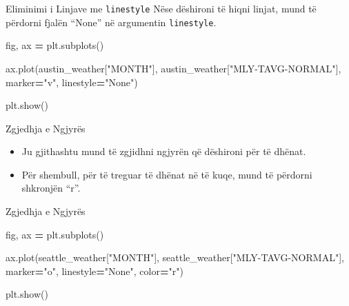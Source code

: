 \documentclass[
  ignorenonframetext,
]{beamer}
\newenvironment{Shaded}{\begin{snugshade}}{\end{snugshade}}
\newcommand{\NormalTok}[1]{#1}
\newcommand{\OperatorTok}[1]{\textcolor[rgb]{0.81,0.36,0.00}{\textbf{#1}}}
\newcommand{\StringTok}[1]{\textcolor[rgb]{0.31,0.60,0.02}{#1}}
\begin{document}
\begin{frame}[fragile]{Eliminimi i Linjave me \texttt{linestyle}}
\protect\hypertarget{eliminimi-i-linjave-me-linestyle}{}
Nëse dëshironi të hiqni linjat, mund të përdorni fjalën ``None'' në
argumentin \texttt{linestyle}.


\begin{Shaded}
\begin{Highlighting}[]
\NormalTok{fig, ax }\OperatorTok{=}\NormalTok{ plt.subplots()}

\NormalTok{ax.plot(austin\_weather[}\StringTok{"MONTH"}\NormalTok{], austin\_weather[}\StringTok{"MLY{-}TAVG{-}NORMAL"}\NormalTok{],}
\NormalTok{marker}\OperatorTok{=}\StringTok{"v"}\NormalTok{, linestyle}\OperatorTok{=}\StringTok{"None"}\NormalTok{)}

\NormalTok{plt.show()}
\end{Highlighting}
\end{Shaded}
\end{frame}

\begin{frame}{Zgjedhja e Ngjyrës}
\protect\hypertarget{zgjedhja-e-ngjyruxebs}{}
\begin{itemize}
\item
  Ju gjithashtu mund të zgjidhni ngjyrën që dëshironi për të dhënat.
\item
  Për shembull, për të treguar të dhënat në të kuqe, mund të përdorni
  shkronjën ``r''.
\end{itemize}
\end{frame}

\begin{frame}[fragile]{Zgjedhja e Ngjyrës}
\protect\hypertarget{zgjedhja-e-ngjyruxebs-1}{}

\begin{Shaded}
\begin{Highlighting}[]
\NormalTok{fig, ax }\OperatorTok{=}\NormalTok{ plt.subplots()}

\NormalTok{ax.plot(seattle\_weather[}\StringTok{"MONTH"}\NormalTok{], seattle\_weather[}\StringTok{"MLY{-}TAVG{-}NORMAL"}\NormalTok{],}
\NormalTok{marker}\OperatorTok{=}\StringTok{"o"}\NormalTok{, linestyle}\OperatorTok{=}\StringTok{"None"}\NormalTok{, color}\OperatorTok{=}\StringTok{"r"}\NormalTok{)}

\NormalTok{plt.show()}
\end{Highlighting}
\end{Shaded}
\end{frame}
\end{document}
